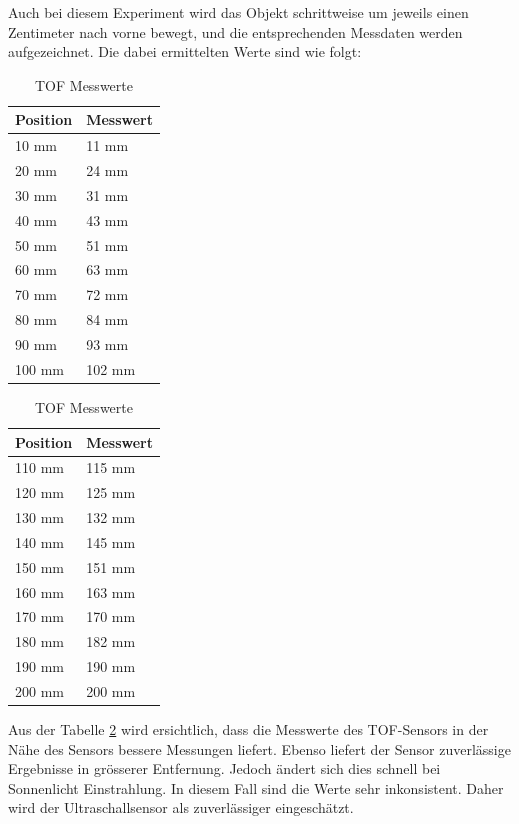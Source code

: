 \documentclass[../main.tex]{subfiles}
\begin{document}
Auch bei diesem Experiment wird das Objekt schrittweise um jeweils einen Zentimeter nach vorne bewegt, und die entsprechenden Messdaten werden aufgezeichnet. Die dabei ermittelten Werte sind wie folgt:
\begin{table}[H]
\centering
\begin{minipage}{0.45\textwidth}
\centering
\begin{tabular}{@{}ll@{}}
\toprule
\textbf{Position} & \textbf{Messwert} \\
\midrule
10 mm  & 11 mm  \\
20 mm  & 24 mm  \\
30 mm  & 31 mm  \\
40 mm  & 43 mm  \\
50 mm  & 51 mm  \\
60 mm  & 63 mm  \\
70 mm  & 72 mm  \\
80 mm  & 84 mm  \\
90 mm  & 93 mm  \\
100 mm & 102 mm \\
\bottomrule
\end{tabular}
\end{minipage}%
\hspace{0.05\textwidth} %
\begin{minipage}{0.45\textwidth}
\centering
\begin{tabular}{@{}ll@{}}
\toprule
\textbf{Position} & \textbf{Messwert} \\
\midrule
110 mm & 115 mm \\
120 mm & 125 mm \\
130 mm & 132 mm \\
140 mm & 145 mm \\
150 mm & 151 mm \\
160 mm & 163 mm \\
170 mm & 170 mm \\
180 mm & 182 mm \\
190 mm & 190 mm \\
200 mm & 200 mm \\
\bottomrule
\end{tabular}
\end{minipage}
\caption{TOF Messwerte}
\label{tab:TOFMD}
\end{table}

Aus der Tabelle \ref{tab:TOFMD} wird ersichtlich, dass die Messwerte des TOF-Sensors in der Nähe des Sensors bessere Messungen liefert. Ebenso liefert der Sensor zuverlässige Ergebnisse in grösserer Entfernung. Jedoch ändert sich dies schnell bei Sonnenlicht Einstrahlung. In diesem Fall sind die Werte sehr inkonsistent. Daher wird der Ultraschallsensor als zuverlässiger eingeschätzt.
\end{document}
